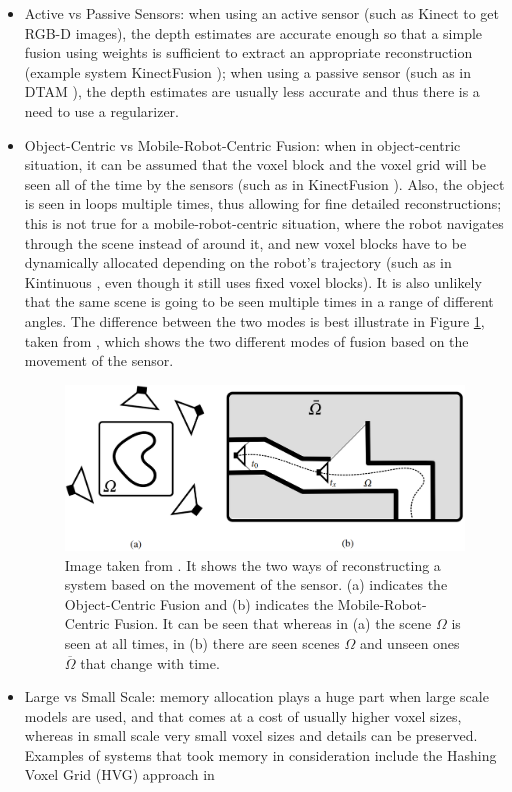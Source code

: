 \documentclass[11pt]{article}
\begin{document}
\begin{itemize}
\item Active vs Passive Sensors: when using an active sensor (such as Kinect to get RGB-D images), the depth estimates are accurate enough so that a simple fusion using weights is sufficient to extract an appropriate reconstruction (example system KinectFusion \cite{kinectfusion}); when using a passive sensor (such as in DTAM \cite{DTAM}), the depth estimates are usually less accurate and thus there is a need to use a regularizer.
\item Object-Centric vs Mobile-Robot-Centric Fusion: when in object-centric situation, it can be assumed that the voxel block and the voxel grid will be seen all of the time by the sensors (such as in KinectFusion \cite{kinectfusion}). Also, the object is seen in loops multiple times, thus allowing for fine detailed reconstructions; this is not true for a mobile-robot-centric situation, where the robot navigates through the scene instead of around it, and new voxel blocks have to be dynamically allocated depending on the robot's trajectory (such as in Kintinuous \cite{kintinuous}, even though it still uses fixed voxel blocks). It is also unlikely that the same scene is going to be seen multiple times in a range of different angles. The difference between the two modes is best illustrate in Figure \ref{fig:RobotVsObjectCent}, taken from \cite{TannerFSR2015}, which shows the two different modes of fusion based on the movement of the sensor.

\begin{figure}[h]
	\includegraphics[width=\linewidth]{RobotVsObjectCent}
	\caption{Image taken from \cite{TannerFSR2015}. It shows the two ways of reconstructing a system based on the movement of the sensor. (a) indicates the Object-Centric Fusion and (b) indicates the Mobile-Robot-Centric Fusion. It can be seen that whereas in (a) the scene $\Omega$ is seen at all times, in (b) there are seen scenes $\Omega$ and unseen ones $\overline{\Omega}$ that change with time.}
	\label{fig:RobotVsObjectCent}
\end{figure}


\item Large vs Small Scale: memory allocation plays a huge part when large scale models are used, and that comes at a cost of usually higher voxel sizes, whereas in small scale very small voxel sizes and details can be preserved. Examples of systems that took memory in consideration include the Hashing Voxel Grid (HVG) approach in \cite{HVG}
\end{itemize}
	
\end{document}
